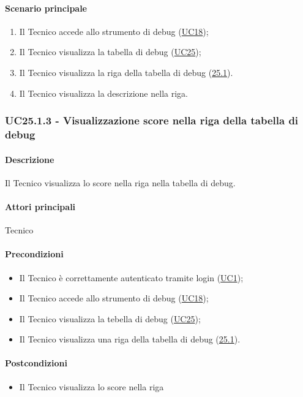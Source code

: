\paragraph*{Scenario principale}
\begin{enumerate}
  \item Il Tecnico accede allo strumento di debug (\hyperref[UC18]{UC18});
  \item Il Tecnico visualizza la tabella di debug (\hyperref[UC25]{UC25});
  \item Il Tecnico visualizza la riga della tabella di debug (\hyperref[UC25poin1]{25.1}).
  \item Il Tecnico visualizza la descrizione nella riga.
\end{enumerate}


\subsubsection{UC25.1.3 - Visualizzazione score nella riga della tabella di debug}\label{UC25point1point3}
\paragraph*{Descrizione}
Il Tecnico visualizza lo score nella riga nella tabella di debug.

\paragraph*{Attori principali}
Tecnico

\paragraph*{Precondizioni}
\begin{itemize}
  \item Il Tecnico è correttamente autenticato tramite login (\hyperref[UC1]{UC1});
  \item Il Tecnico accede allo strumento di debug (\hyperref[UC18]{UC18});
  \item Il Tecnico visualizza la tebella di debug (\hyperref[UC25]{UC25});
  \item Il Tecnico visualizza una riga della tabella di debug (\hyperref[25point1]{25.1}).
\end{itemize}

\paragraph*{Postcondizioni}
\begin{itemize}
  \item Il Tecnico visualizza lo score nella riga
\end{itemize}


